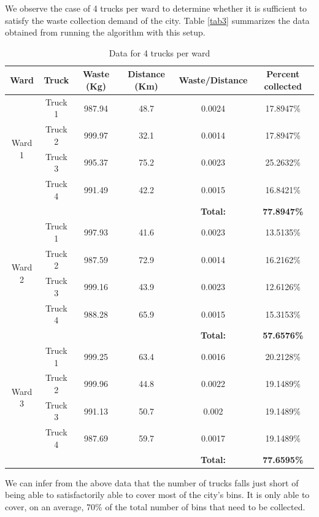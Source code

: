 \documentclass[12pt]{article}
\begin{document}
We observe the case of 4 trucks per ward to determine whether it is sufficient to satisfy the waste collection demand of the city. Table \ref{tab3} summarizes the data obtained from running the algorithm with this setup.
\begin{table}[H]
    \centering
    \caption{ Data for 4 trucks per ward} \label{tab2}
    \vspace*{0.3cm}
    \begin{tabular}{|c|c|c|c|c|c|}
        \hline Ward & Truck & Waste (Kg) & Distance (Km) & Waste/Distance & Percent collected \\
        \hline \multirow{4}{*}{Ward 1} & Truck 1 & 987.94& 48.7 &0.0024  &17.8947\% \\
        \cline{2-6}& Truck 2 &999.97&32.1&0.0014&17.8947\%\\        
        \cline{2-6}& Truck 3 &995.37&75.2&0.0023&25.2632\%\\        
        \cline{2-6}& Truck 4 &991.49&42.2&0.0015&16.8421\%\\
        \hline & & & &\textbf{Total:} &\textbf{77.8947\%}\\
        \hline \multirow{4}{*}{Ward 2} & Truck 1 &997.93 &41.6  & 0.0023  &13.5135\% \\
        \cline{2-6}& Truck 2 &987.59&72.9&0.0014&16.2162\%\\        
        \cline{2-6}& Truck 3 &999.16&43.9&0.0023&12.6126\%\\        
        \cline{2-6}& Truck 4 &988.28&65.9&0.0015&15.3153\%\\
        \hline & & & &\textbf{Total:} &\textbf{57.6576\%}\\     
        \hline \multirow{4}{*}{Ward 3} & Truck 1 &999.25  &63.4  &0.0016  &20.2128\% \\
        \cline{2-6}& Truck 2 &999.96&44.8&0.0022&19.1489\%\\        
        \cline{2-6}& Truck 3 &991.13&50.7&0.002&19.1489\%\\        
        \cline{2-6}& Truck 4 &987.69&59.7&0.0017&19.1489\%\\
        \hline & & & &\textbf{Total:} &\textbf{77.6595\%}\\
        \hline      
    \end{tabular}
\end{table}

We can infer from the above data that the number of trucks falls just short of being able to satisfactorily able to cover most of the city's bins. It is only able to cover, on an average, 70\% of the total number of bins that need to be collected.
\end{document}
